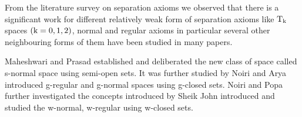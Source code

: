 From the literature survey on separation axioms we observed that there is a significant work for different relatively weak form of separation axioms like $\mathrm{T}_{\mathrm{k}}$ spaces $(\mathrm{k}=0, 1, 2)$, normal and regular axioms in particular several other neighbouring forms of them have been studied in many papers.

Maheshwari and Prasad \cite{Maheshwari} established and deliberated the new class of space called s-normal space using semi-open sets. It was further studied by Noiri \cite{Dontchev2} and Arya \cite{Arya1} introduced g-regular and g-normal spaces using g-closed sets. Noiri and Popa \cite{Popa} further investigated the concepts introduced by Sheik John \cite{Sheik1} introduced and studied the w-normal, w-regular using w-closed sets.

